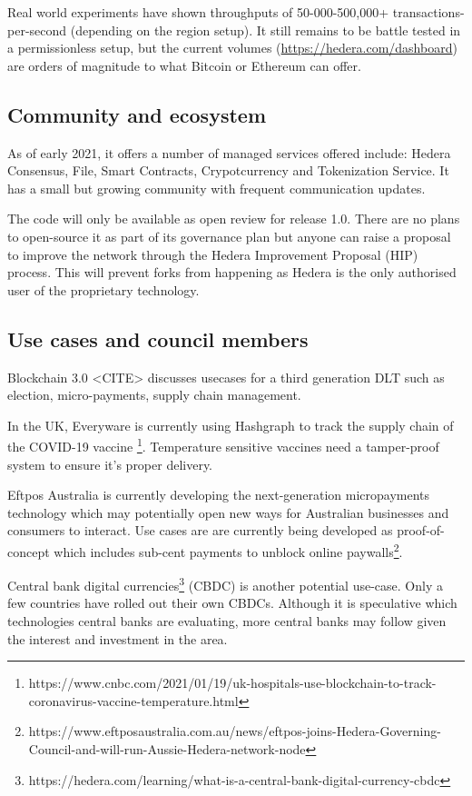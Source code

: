 Real world experiments have shown throughputs of 50-000-500,000+ transactions-per-second (depending on the region setup)\cite{baird2018hedera}. It still remains to be battle tested in a permissionless setup, but the current volumes (\url{https://hedera.com/dashboard}) are orders of magnitude to what Bitcoin or Ethereum can offer.

\subsection{Community and ecosystem}

As of early 2021, it offers a number of managed services offered include: Hedera Consensus, File, Smart Contracts, Crypotcurrency and Tokenization Service. It has a small but growing community with frequent communication updates.

The code will only be available as open review for release 1.0. There are no plans to open-source it as part of its governance plan but anyone can raise a proposal to improve the network through the Hedera Improvement Proposal (HIP) process. This will prevent forks from happening as Hedera is the only authorised user of the proprietary technology. 

\subsection{Use cases and council members}

Blockchain 3.0 <CITE> discusses usecases for a third generation DLT such as election, micro-payments, supply chain management.

In the UK, Everyware is currently using Hashgraph to track the supply chain of the COVID-19 vaccine \footnote{https://www.cnbc.com/2021/01/19/uk-hospitals-use-blockchain-to-track-coronavirus-vaccine-temperature.html}. Temperature sensitive vaccines need a tamper-proof system to ensure it's proper delivery.

Eftpos Australia is currently developing the next-generation micropayments technology which may potentially open new ways for Australian businesses and consumers to interact. Use cases are are currently being developed as proof-of-concept which includes sub-cent payments to unblock online paywalls\footnote{https://www.eftposaustralia.com.au/news/eftpos-joins-Hedera-Governing-Council-and-will-run-Aussie-Hedera-network-node}.

Central bank digital currencies\footnote{https://hedera.com/learning/what-is-a-central-bank-digital-currency-cbdc} (CBDC) is another potential use-case. Only a few countries have rolled out their own CBDCs. Although it is speculative which technologies central banks are evaluating, more central banks may follow given the interest and investment in the area. 


